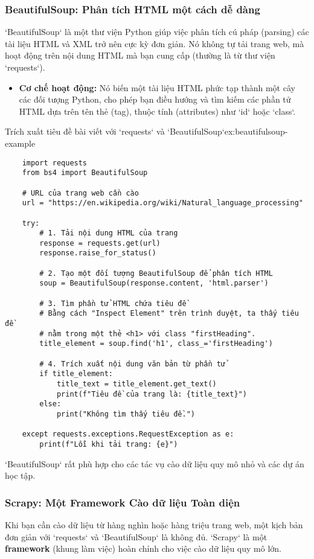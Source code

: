 \subsubsection{BeautifulSoup: Phân tích HTML một cách dễ dàng}
`BeautifulSoup` là một thư viện Python giúp việc phân tích cú pháp (parsing) các tài liệu HTML và XML trở nên cực kỳ đơn giản. Nó không tự tải trang web, mà hoạt động trên nội dung HTML mà bạn cung cấp (thường là từ thư viện `requests`).

\begin{itemize}
    \item \textbf{Cơ chế hoạt động:} Nó biến một tài liệu HTML phức tạp thành một cây các đối tượng Python, cho phép bạn điều hướng và tìm kiếm các phần tử HTML dựa trên tên thẻ (tag), thuộc tính (attributes) như `id` hoặc `class`.
\end{itemize}
\begin{example}{Trích xuất tiêu đề bài viết với `requests` và `BeautifulSoup`}{ex:beautifulsoup-example}
    \begin{verbatim}
    import requests
    from bs4 import BeautifulSoup

    # URL của trang web cần cào
    url = "https://en.wikipedia.org/wiki/Natural_language_processing"

    try:
        # 1. Tải nội dung HTML của trang
        response = requests.get(url)
        response.raise_for_status()
        
        # 2. Tạo một đối tượng BeautifulSoup để phân tích HTML
        soup = BeautifulSoup(response.content, 'html.parser')
        
        # 3. Tìm phần tử HTML chứa tiêu đề
        # Bằng cách "Inspect Element" trên trình duyệt, ta thấy tiêu đề
        # nằm trong một thẻ <h1> với class "firstHeading".
        title_element = soup.find('h1', class_='firstHeading')
        
        # 4. Trích xuất nội dung văn bản từ phần tử
        if title_element:
            title_text = title_element.get_text()
            print(f"Tiêu đề của trang là: {title_text}")
        else:
            print("Không tìm thấy tiêu đề.")
            
    except requests.exceptions.RequestException as e:
        print(f"Lỗi khi tải trang: {e}")
    \end{verbatim}
\end{example}
`BeautifulSoup` rất phù hợp cho các tác vụ cào dữ liệu quy mô nhỏ và các dự án học tập.

\subsubsection{Scrapy: Một Framework Cào dữ liệu Toàn diện}
Khi bạn cần cào dữ liệu từ hàng nghìn hoặc hàng triệu trang web, một kịch bản đơn giản với `requests` và `BeautifulSoup` là không đủ. `Scrapy` là một \textbf{framework} (khung làm việc) hoàn chỉnh cho việc cào dữ liệu quy mô lớn.

